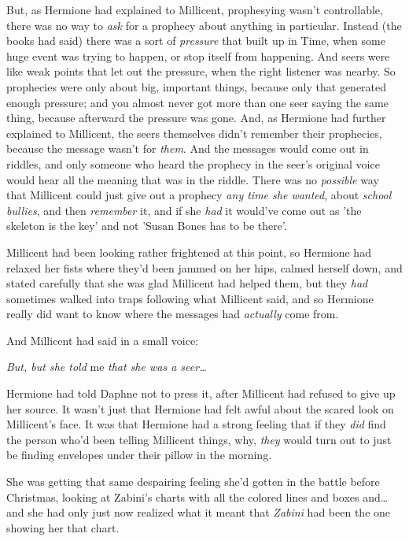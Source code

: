 But, as Hermione had explained to Millicent, prophesying wasn't controllable, 
there was no way to \emph{ask} for a prophecy about anything in particular. 
Instead (the books had said) there was a sort of \emph{pressure} that built up 
in Time, when some huge event was trying to happen, or stop itself from 
happening. And seers were like weak points that let out the pressure, when the 
right listener was nearby. So prophecies were only about big, important things, 
because only that generated enough pressure; and you almost never got more than 
one seer saying the same thing, because afterward the pressure was gone. And, 
as Hermione had further explained to Millicent, the seers themselves didn't 
remember their prophecies, because the message wasn't for \emph{them}. And the 
messages would come out in riddles, and only someone who heard the prophecy in 
the seer's original voice would hear all the meaning that was in the riddle. 
There was no \emph{possible} way that Millicent could just give out a prophecy 
\emph{any time she wanted}, about \emph{school bullies}, and then 
\emph{remember} it, and if she \emph{had} it would've come out as 'the skeleton 
is the key' and not 'Susan Bones has to be there'.

Millicent had been looking rather frightened at this point, so Hermione had 
relaxed her fists where they'd been jammed on her hips, calmed herself down, 
and stated carefully that she was glad Millicent had helped them, but they 
\emph{had} sometimes walked into traps following what Millicent said, and so 
Hermione really did want to know where the messages had \emph{actually} come 
from.

And Millicent had said in a small voice:

\emph{But, but she told} me\emph{ that she was a seer{\ldots}}

Hermione had told Daphne not to press it, after Millicent had refused to give 
up her source. It wasn't just that Hermione had felt awful about the scared 
look on Millicent's face. It was that Hermione had a strong feeling that if 
they \emph{did} find the person who'd been telling Millicent things, why, 
\emph{they} would turn out to just be finding envelopes under their pillow in 
the morning.

She was getting that same despairing feeling she'd gotten in the battle before 
Christmas, looking at Zabini's charts with all the colored lines and boxes 
and{\ldots} and she had only just now realized what it meant that \emph{Zabini} 
had been the one showing her that chart.

